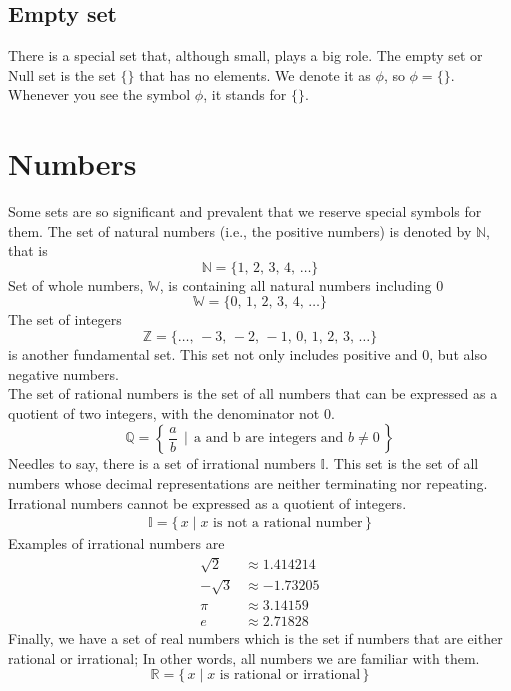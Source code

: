 \subsection{Empty set}
There is a special set that, although small, plays a big role. The
empty set or Null set is the set $\{\}$ that has no elements. We denote it as $\phi$, so $\phi=\{\}$.
Whenever you see the symbol $\phi$, it stands for $\{\}$.
\section{Numbers}
Some sets are so significant and prevalent that we reserve special
symbols for them. The set of natural numbers (i.e., the positive numbers) is denoted by $\mathbb{N}$, that is
\begin{equation*}
        \mathbb{N} = \{1,\,2,\,3,\,4,\, \ldots\}
\end{equation*}
Set of whole numbers, $\mathbb{W}$, is containing all natural numbers
including 0
\begin{equation*}
        \mathbb{W} = \{0,\,1,\,2,\,3,\,4,\,\ldots \}
\end{equation*}
The set of integers
\begin{equation*}
        \mathbb{Z} = \{\dots,\, -3,\,-2,\,-1,\,0,\,1,\,2,\,3,\,\ldots \}
\end{equation*}
is another fundamental set. This set not only includes positive and
0, but also negative numbers.\\
The set of rational numbers is the set of all numbers that can be
expressed as a quotient of two integers, with the denominator not 0.
\begin{equation*}
        \mathbb{Q} = \left\{\,\frac{a}{b}\, \mid\, \text{a and b are integers and $b\neq0$}\,\right\}
\end{equation*}
Needles to say, there is a set of irrational numbers $\mathbb{I}$. This set is the set of all numbers whose decimal representations are neither terminating nor repeating. Irrational numbers cannot be expressed as a quotient of integers.
\begin{gather*}
    \mathbb{I}=\{\, x \mid x \text{ is not a rational number}\,\}
\end{gather*}
Examples of irrational numbers are
\begin{align*}
        \sqrt{2} &\approx 1.414214 \\
        -\sqrt{3} &\approx -1.73205\\
        \pi &\approx 3.14159\\
        e &\approx  2.71828
\end{align*}
Finally, we have a set of real numbers which is the set if numbers
that are either rational or irrational; In other words, all numbers we are familiar with them.
\begin{equation*}
    \mathbb{R}=\{\, x \mid x \text{ is rational or irrational}\,\}
\end{equation*}
